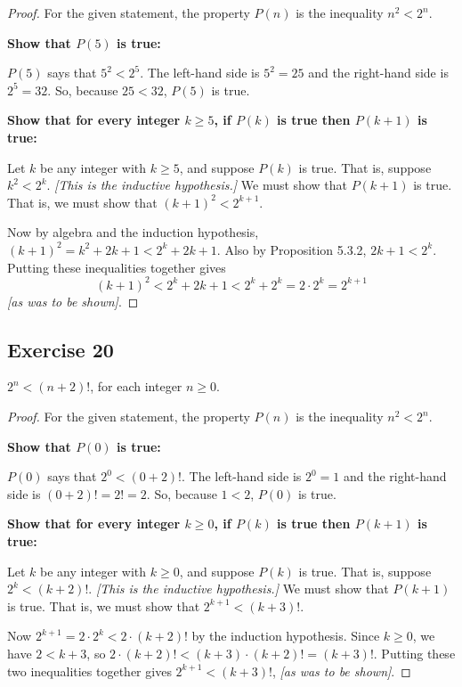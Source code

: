 \documentclass[14pt]{extarticle}
\begin{document}
\begin{proof}
    For the given statement, the property $P(n)$ is the inequality $n^2 < 2^n$.

        {\bf Show that $P(5)$ is true:}

    $P(5)$ says that $5^2 < 2^5$. The left-hand side is $5^2 = 25$ and the right-hand side is $2^5 = 32$. So, because $25 < 32$, $P(5)$ is true.

        {\bf Show that for every integer $k \geq 5$, if $P(k)$ is true then $P(k + 1)$ is true:}

    Let $k$ be any integer with $k \geq 5$, and suppose $P(k)$ is true. That is, suppose $k^2 < 2^k$. {\it [This is the inductive hypothesis.]} We must show that $P(k + 1)$ is true. That is, we must show that $(k+1)^2 < 2^{k+1}$.

    Now by algebra and the induction hypothesis, $(k+1)^2 = k^2 + 2k + 1 < 2^k + 2k + 1$. Also by Proposition 5.3.2, $2k + 1 < 2^k$. Putting these inequalities together gives
    \[
        (k+1)^2 < 2^k + 2k + 1 < 2^k + 2^k = 2 \cdot 2^k = 2^{k+1}
    \]
    {\it [as was to be shown]}.
\end{proof}

\subsection{Exercise 20}
$2^n < (n + 2)!$, for each integer $n \geq 0$.

\begin{proof}
    For the given statement, the property $P(n)$ is the inequality $n^2 < 2^n$.

        {\bf Show that $P(0)$ is true:}

    $P(0)$ says that $2^0 < (0 + 2)!$. The left-hand side is $2^0 = 1$ and the right-hand side is $(0 + 2)! = 2! = 2$. So, because $1 < 2$, $P(0)$ is true.

        {\bf Show that for every integer $k \geq 0$, if $P(k)$ is true then $P(k + 1)$ is true:}

    Let $k$ be any integer with $k \geq 0$, and suppose $P(k)$ is true. That is, suppose $2^k < (k + 2)!$. {\it [This is the inductive hypothesis.]} We must show that $P(k + 1)$ is true. That is, we must show that $2^{k+1} < (k + 3)!$.

    Now $2^{k+1} = 2 \cdot 2^k < 2 \cdot (k+2)!$ by the induction hypothesis. Since $k \geq 0$, we have $2 < k+3$, so $2 \cdot (k+2)! < (k+3) \cdot (k+2)! = (k+3)!$. Putting these two inequalities together gives $2^{k+1} < (k+3)!$, {\it [as was to be shown]}.
\end{proof}
\end{document}
